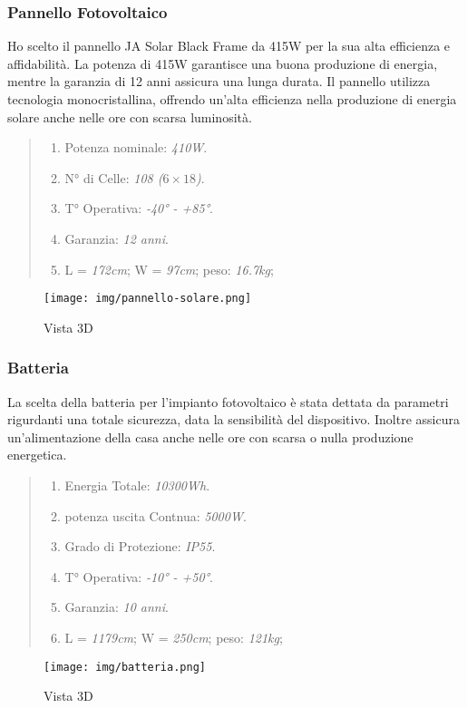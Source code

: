 \documentclass[italian, 12pt, a4paper]{article}
\begin{document}
\subsubsection{Pannello Fotovoltaico}
Ho scelto il pannello JA Solar Black Frame da 415W per la sua alta efficienza e affidabilità. La potenza di 415W garantisce una buona produzione di energia, mentre la garanzia di 12 anni assicura una lunga durata. Il pannello utilizza tecnologia monocristallina, offrendo un'alta efficienza nella produzione di energia solare anche nelle ore con scarsa luminosità.
\begin{quote}
    \begin{enumerate}
        \item Potenza nominale: \emph{410W}.
        \item N° di Celle: \emph{108 ($6\times 18$)}.
        \item T° Operativa: \emph{-40° - +85°}.
        \item Garanzia: \emph{12 anni}.
        \item L = \emph{172cm}; W = \emph{97cm}; peso: \emph{16.7kg};
    \end{enumerate}
\end{quote}
\vspace{-15px}
\begin{figure}[h]
    \centering
    \texttt{[image: img/pannello-solare.png]}
    \caption{Vista 3D}
    \label{fig:pannello-solare}
\end{figure}
\subsubsection{Batteria}
La scelta della batteria per l'impianto fotovoltaico è stata dettata da parametri rigurdanti una totale sicurezza, data la sensibilità del dispositivo. Inoltre assicura un'alimentazione della casa anche nelle ore con scarsa o nulla produzione energetica.
\begin{quote}
    \begin{enumerate}
        \item Energia Totale: \emph{10300Wh}.
        \item potenza uscita Contnua: \emph{5000W}.
        \item Grado di Protezione: \emph{IP55}.
        \item T° Operativa: \emph{-10° - +50°}.
        \item Garanzia: \emph{10 anni}.
        \item L = \emph{1179cm}; W = \emph{250cm}; peso: \emph{121kg};
    \end{enumerate}
\end{quote}
\vspace{-15px}
\begin{figure}[h]
    \centering
    \texttt{[image: img/batteria.png]}
    \caption{Vista 3D}
    \label{fig:batteria}
\end{figure}
\end{document}
